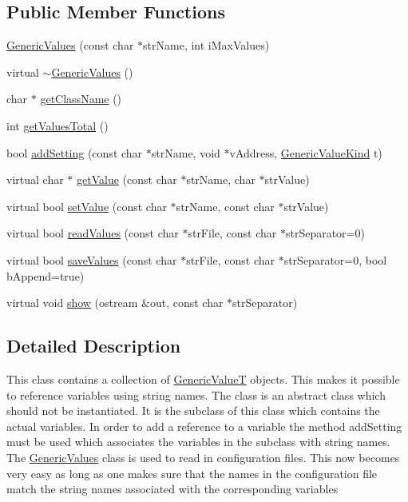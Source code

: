 \subsection*{Public Member Functions}
\begin{DoxyCompactItemize}
\item 
\hyperlink{classGenericValues_a292b8984daf043d89e6101ffe2a91d39}{Generic\+Values} (const char $\ast$str\+Name, int i\+Max\+Values)
\item 
virtual \hyperlink{classGenericValues_a6e44fb16050936c76930294bf33d1897}{$\sim$\+Generic\+Values} ()
\item 
char $\ast$ \hyperlink{classGenericValues_a5f1cde2b4413db0e19d1d1f2f97fc7bb}{get\+Class\+Name} ()
\item 
int \hyperlink{classGenericValues_a2dabc28295d3c2d2173ff83953731988}{get\+Values\+Total} ()
\item 
bool \hyperlink{classGenericValues_af733534c2df3eadf5d113193bf1cd569}{add\+Setting} (const char $\ast$str\+Name, void $\ast$v\+Address, \hyperlink{GenericValues_8h_aaecaa3e46488aab71938a199e362d0c6}{Generic\+Value\+Kind} t)
\item 
virtual char $\ast$ \hyperlink{classGenericValues_a9c1f39be5e66e2137378eee180f57aff}{get\+Value} (const char $\ast$str\+Name, char $\ast$str\+Value)
\item 
virtual bool \hyperlink{classGenericValues_a61fbb57a8d3daf89299c3d7be864b1f2}{set\+Value} (const char $\ast$str\+Name, const char $\ast$str\+Value)
\item 
virtual bool \hyperlink{classGenericValues_a94a111a3ef7166c7057c79b29caa8919}{read\+Values} (const char $\ast$str\+File, const char $\ast$str\+Separator=0)
\item 
virtual bool \hyperlink{classGenericValues_adc2b3a50f2a756d8e5697a5b57a23540}{save\+Values} (const char $\ast$str\+File, const char $\ast$str\+Separator=0, bool b\+Append=true)
\item 
virtual void \hyperlink{classGenericValues_a448ac46983e38ef2e4d150953376572d}{show} (ostream \&out, const char $\ast$str\+Separator)
\end{DoxyCompactItemize}


\subsection{Detailed Description}
This class contains a collection of \hyperlink{classGenericValueT}{Generic\+ValueT} objects. This makes it possible to reference variables using string names. The class is an abstract class which should not be instantiated. It is the subclass of this class which contains the actual variables. In order to add a reference to a variable the method \textquotesingle{}add\+Setting\textquotesingle{} must be used which associates the variables in the subclass with string names. The \hyperlink{classGenericValues}{Generic\+Values} class is used to read in configuration files. This now becomes very easy as long as one makes sure that the names in the configuration file match the string names associated with the corresponding variables 

